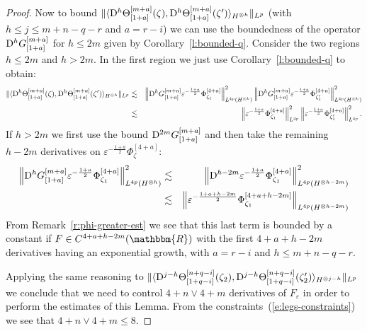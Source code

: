 \begin{proof}
  
  Now to bound $\| \langle \mathrm{D}^h \Theta_{[1 + a]}^{[m + a]} (\zeta),
  \mathrm{D}^h \Theta_{[1 + a]}^{[m + a]} (\zeta') \rangle_{H^{\otimes h}}
  \|_{L^p}$ (with $h \leqslant j \leqslant m + n - q - r$ and $a = r - i$) we
  can use the boundedness of the operator $\mathrm{D}^h G_{[1 + a]}^{[m + a]}$ for
  $h \leqslant 2 m$ given by Corollary~\ref{l:bounded-q}. Consider the two
  regions $h \leqslant 2 m$ and $h > 2 m$. In the first region we just use
  Corollary~\ref{l:bounded-q} to obtain:
  \begin{eqnarray*}
    \| \langle \mathrm{D}^h \Theta_{[1 + a]}^{[m + a]} (\zeta), \mathrm{D}^h
    \Theta_{[1 + a]}^{[m + a]} (\zeta') \rangle_{H^{\otimes h}} \|_{L^p} &
    \lesssim & \left\| \mathrm{D}^h G_{[1 + a]}^{[m + a]} \varepsilon^{- \frac{1 +
    a}{2}} \Phi^{[4 + a]}_{\zeta_1} \right\|^2_{L^{4 p} (H^{\otimes h})}
    \left\| \mathrm{D}^h G_{[1 + a]}^{[m + a]} \varepsilon^{- \frac{1 + a}{2}}
    \Phi^{[4 + a]}_{\zeta'_1} \right\|^2_{L^{4 p} (H^{\otimes h})}\\
    & \lesssim & \left\| \varepsilon^{- \frac{1 + a}{2}} \Phi^{[4 +
    a]}_{\zeta_1} \right\|_{L^{4 p}}^2 \left\| \varepsilon^{- \frac{1 + a}{2}}
    \Phi^{[4 + a]}_{\zeta'_1} \right\|_{L^{4 p}}^2 .
  \end{eqnarray*}
  If $h > 2 m$ we first use the bound $\mathrm{D}^{2 m} G_{[1 + a]}^{[m + a]}$ and
  then take the remaining $h - 2 m$ derivatives on $\varepsilon^{- \frac{1 +
  a}{2}} \Phi^{[4 + a]}_{\zeta}$:
  \begin{eqnarray*}
    \left\| \mathrm{D}^h G_{[1 + a]}^{[m + a]} \varepsilon^{- \frac{1 + a}{2}}
    \Phi_{\zeta_1}^{[4 + a]} \right\|_{L^{4 p} (H^{\otimes h})}^2 & \lesssim &
    \left\| \mathrm{D}^{h - 2 m} \varepsilon^{- \frac{1 + a}{2}}
    \Phi_{\zeta_1}^{[4 + a]} \right\|_{L^{4 p} (H^{\otimes h - 2 m})}^2\\
    & \lesssim & \left\| \varepsilon^{- \frac{1 + a + h - 2 m}{2}}
    \Phi_{\zeta_1}^{[4 + a + h - 2 m]} \right\|_{L^{4 p} (H^{\otimes h - 2
    m})}
  \end{eqnarray*}
  From Remark~\ref{r:phi-greater-est} we see that this last term is bounded by
  a constant if $F \in C^{4 + a + h - 2 m} (\mathbbm{R})$ with the first $4 +
  a + h - 2 m$ derivatives having an exponential growth, with $a = r - i$ and
  $h \leqslant m + n - q - r$.
  
  Applying the same reasoning to $\| \langle \mathrm{D}^{j - h} \Theta_{[1 + q -
  i]}^{[n + q - i]} (\zeta_2), \mathrm{D}^{j - h} \Theta_{[1 + q - i]}^{[n + q -
  i]} (\zeta'_2) \rangle_{H^{\otimes j - h}} \|_{L^p}$ we conclude that we
  need to control $4 + n \vee 4 + m$ derivatives of $F_{\varepsilon}$ in order
  to perform the estimates of this Lemma. From the
  constraints~(\ref{e:legs-constraints}) we see that $4 + n \vee 4 + m
  \leqslant 8$.
\end{proof}

